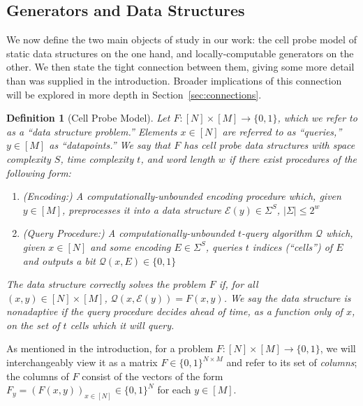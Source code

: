 \documentclass[11pt]{article}
\newtheorem{definition}{Definition}
\newcommand{\B}{\{0,1\}}
\newcommand{\N}{[N]}
\begin{document}
\subsection{Generators and Data Structures}\label{subsec:gen-vs-cell}
We now define the two main objects of study in our work: the cell probe model of static data structures on the one hand, and locally-computable generators on the other. We then state the tight connection between them, giving some more detail than was supplied in the introduction. Broader implications of this connection will be explored in more depth in Section~\ref{sec:connections}.

\begin{definition}[Cell Probe Model]
Let $F: \N \times [M] \to \{0,1\}$, which we refer to as a ``data structure problem.'' Elements $x \in \N$ are referred to as ``queries,'' $y \in [M]$ as ``datapoints.'' We say that $F$ has cell probe data structures with space complexity $S$, time complexity $t$, and word length $w$ if there exist procedures of the following form:
\begin{enumerate}
    \item (Encoding:) A computationally-unbounded encoding procedure which, given $y \in [M]$, preprocesses it into a data structure $\mathcal{E}(y) \in \Sigma^S$, $|\Sigma| \leq 2^w$ 
    \item (Query Procedure:) A computationally-unbounded $t$-query algorithm $\mathcal{Q}$ which, given $x \in \N$ and some encoding $E \in \Sigma^S$, queries $t$ indices (``cells'') of $E$ and outputs a bit $\mathcal{Q}(x,E) \in \B$
\end{enumerate}
The data structure correctly solves the problem $F$ if, for all $(x,y) \in \N \times [M]$, $\mathcal{Q}(x,\mathcal{E}(y)) = F(x,y)$. We say the data structure is \emph{nonadaptive} if the query procedure decides ahead of time, as a function only of $x$, on the set of $t$ cells which it will query.
\end{definition}
As mentioned in the introduction, for a problem $F: \N \times [M] \to \B$, we will interchangeably view it as a matrix $F \in \B^{N \times M}$ and refer to its set of \emph{columns}; the columns of $F$ consist of the vectors of the form $F_y = (F(x,y))_{x \in \N}\in \B^N$ for each $y \in [M]$.
\end{document}
